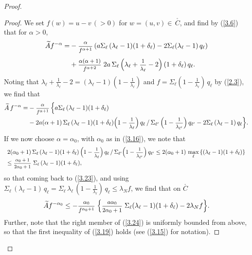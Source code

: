 \documentclass[12pt,leqno]{article}
\def\dis{\displaystyle}
\def\f{\footnotesize}
\def\wt{\widetilde}
\begin{document}
\begin{proof}
\begin{proof}
We set $f(w) = u-v \, (> 0)$ for $w = (u,v) \in \,\stackrel{_\circ}{C}$, and find by (\ref{3.6}) that for $\alpha > 0$,
\begin{equation}\label{3.22}
\begin{split}
\wt{A} f^{-\alpha} = &  - \mbox{\f $\dis\frac{\alpha}{f^{\alpha + 1}}$} \,(a \Sigma_\ell \,(\lambda_\ell - 1) (1 + \delta_\ell) - 2 \Sigma_\ell (\lambda_\ell - 1) \,q_\ell)
\\[1ex]
& +  \mbox{\f $\dis\frac{\alpha (\alpha + 1)}{f^{\alpha + 2}}$}  \; 2a \, \Sigma_\ell \,\Big(\lambda_\ell + \mbox{\f $\dis\frac{1}{\lambda_\ell}$} - 2\Big) \,(1+ \delta_\ell) \, q_\ell.
\end{split}
\end{equation}
Noting that $\lambda_\ell + \frac{1}{\lambda_\ell} - 2 = (\lambda_\ell - 1)(1 - \frac{1}{\lambda_\ell})$ and $f = \Sigma_\ell (1 - \frac{1}{\lambda_\ell}) \,q_\ell$ by (\ref{2.3}), we find that
\begin{equation}\label{3.23}
\begin{split}
\wt{A} \, f^{-\alpha}  = &- \mbox{\f $\dis\frac{\alpha}{f^{\alpha + 1}}$} \,\Big\{a \Sigma_\ell \,(\lambda_\ell - 1)(1 + \delta_\ell) 
\\
&- 2a (\alpha + 1) \, \Sigma_\ell \,(\lambda_\ell - 1) (1 + \delta_\ell) \Big(1 - \mbox{\f $\dis\frac{1}{\lambda_\ell}$}\Big) \, q_\ell \, / \, \Sigma_{\ell^\prime}\, \Big(1 - \mbox{\f $\dis\frac{1}{\lambda_{\ell^\prime}}$}\Big) \, q_{\ell^\prime} - 2 \Sigma_\ell \,(\lambda_\ell - 1) \,q_\ell\Big\}.
\end{split}
\end{equation}
If we now choose $\alpha = \alpha_0$, with $\alpha_0$ as in (\ref{3.16}), we note that
\begin{equation*}
\begin{array}{l}
2 (\alpha_0 + 1) \, \Sigma_\ell \,(\lambda_\ell -1) (1 + \delta_\ell) \, \Big(1 - \mbox{\f $\dis\frac{1}{\lambda_\ell}$}\Big) \, q_\ell  \, / \, \Sigma_{\ell^\prime} \Big(1 - \mbox{\f $\dis\frac{1}{\lambda_{\ell^\prime}}$}\Big) \, q_{\ell^\prime} \le 2 (\alpha_0 + 1) \, \max\limits_\ell \,\{(\lambda_\ell - 1)(1 + \delta_\ell)\}
\\
\le \mbox{\f $\dis\frac{\alpha_0 +1}{2 \alpha_0 + 1}$} \; \Sigma_\ell\, (\lambda_\ell - 1) (1 + \delta_\ell),
\end{array}
\end{equation*}
so that coming back to (\ref{3.23}), and using $\Sigma_\ell \,(\lambda_\ell - 1) \,q_\ell = \Sigma_\ell \,\lambda_\ell \, (1 - \frac{1}{\lambda_\ell}) \, q_\ell \le \lambda_N f$, we find that on $\stackrel{_\circ}{C}$
\begin{equation}\label{3.24}
\wt{A} f^{-\alpha_0} \le - \mbox{\f $\dis\frac{\alpha_0}{f^{\alpha_0 + 1}}$} \; \Big\{ \mbox{\f $\dis\frac{a \alpha_0}{2 \alpha_0 + 1}$} \; \Sigma_\ell (\lambda_\ell - 1)(1 + \delta_\ell) - 2 \lambda_N f\Big\}.
\end{equation}
Further, note that the right member of (\ref{3.24}) is uniformly bounded from above, so that the first inequality of (\ref{3.19}) holds (see (\ref{3.15}) for notation).


\end{proof}
\end{proof}
\end{document}
